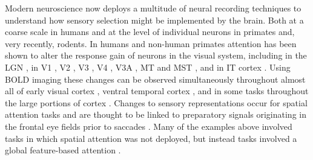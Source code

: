 Modern neuroscience now deploys a multitude of neural recording techniques to understand how sensory selection might be implemented by the brain. Both at a coarse scale in humans and at the level of individual neurons in primates and, very recently, rodents. In humans and non-human primates attention has been shown to alter the response gain of neurons in the visual system, including in the LGN \citep{OConnor2002-mx}, in V1 \citep{Motter1993-av}, V2 \citep{Buffalo2010-lr,Luck1997-sq,Motter1993-av}, V3 \citep{Liu2007-jx,Pestilli2011-gi,Saenz2002-fs,Silver2007-vd}, V4 \citep{Buffalo2010-lr,Connor1996-nm,Luck1997-sq,McAdams1999-jy,Moran1985-cv,Motter1993-av,Reynolds2000-mg,Spitzer1988-ib}, V3A \citep{Serences2007-le}, MT \citep{Beauchamp1997-rh,OCraven1997-ej,Saenz2002-fs,Seidemann1999-oz,Serences2007-le,Treue1999-mp,Treue1996-ez} and MST \citep{OCraven1997-ej,Treue1996-ez}, and in IT cortex \citep{Chelazzi1998-gx,Moran1985-cv}. Using BOLD imaging these changes can be observed simultaneously throughout almost all of early visual cortex \citep{Liu2007-jx,Pestilli2011-gi,Saenz2002-fs,Silver2007-vd}, ventral temporal cortex \citep{Baldauf2014-uj}, and in some tasks throughout the large portions of cortex \citep{Cukur2013-gx}. Changes to sensory representations occur for spatial attention tasks \citep{Klein2014-oe,McAdams1999-jy,Mitchell2009-do,Pestilli2011-gi,Womelsdorf2006-np} and are thought to be linked to preparatory signals \citep{Tolias2001-xl,Moore2003-kz,Moore2001-qz} originating in the frontal eye fields prior to saccades \citep{Moore2003-fs}. Many of the examples above involved tasks in which spatial attention was not deployed, but instead tasks involved a global feature-based attention \citep{Baldauf2014-uj,Harel2014-wd,Huk2000-uj,Jehee2011-mb,Saenz2002-fs,Saenz2003-qz,Serences2007-le,Treue1999-mp,Cukur2013-gx}.

